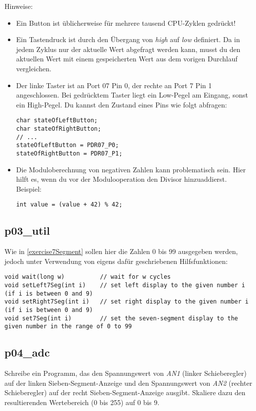 Hinweise:\begin{itemize}
\item
Ein Button ist üblicherweise für mehrere tausend CPU-Zyklen gedrückt!

\item
Ein Tastendruck ist durch den Übergang von \emph{high} auf \emph{low} definiert.
Da in jedem Zyklus nur der aktuelle Wert abgefragt werden kann, musst du den aktuellen Wert mit einem gespeicherten Wert aus dem vorigen Durchlauf vergleichen.

\item
Der linke Taster ist an Port 07 Pin 0, der rechte an Port 7 Pin 1 angeschlossen.
Bei gedrücktem Taster liegt ein Low-Pegel am Eingang, sonst ein High-Pegel.
Du kannst den Zustand eines Pins wie folgt abfragen:
\begin{lstlisting}
char stateOfLeftButton; 
char stateOfRightButton;
// ...
stateOfLeftButton = PDR07_P0; 
stateOfRightButton = PDR07_P1;
\end{lstlisting}

\item
Die Moduloberechnung von negativen Zahlen kann problematisch sein.
Hier hilft es, wenn du vor der Modulooperation den Divisor hinzuaddierst.
Beispiel:
\begin{lstlisting}
int value = (value + 42) % 42;
\end{lstlisting}

\end{itemize}

\subsection{p03\_util}
\label{exercise7SegmentUtil}
Wie in \ref{exercise7Segment} sollen hier die Zahlen 0 bis 99 ausgegeben werden, jedoch unter Verwendung von eigens dafür geschriebenen Hilfsfunktionen:
\begin{lstlisting}
void wait(long w)          // wait for w cycles
void setLeft7Seg(int i)    // set left display to the given number i (if i is between 0 and 9)
void setRight7Seg(int i)   // set right display to the given number i (if i is between 0 and 9)
void set7Seg(int i)        // set the seven-segment display to the given number in the range of 0 to 99
\end{lstlisting}

\subsection{p04\_adc}
Schreibe ein Programm, das den Spannungswert von \emph{AN1} (linker Schieberegler) auf der linken Sieben-Segment-Anzeige und den Spannungswert von \emph{AN2} (rechter Schieberegler) auf der recht Sieben-Segment-Anzeige ausgibt.
Skaliere dazu den resultierenden Wertebereich (0 bis 255) auf 0 bis 9.\\

